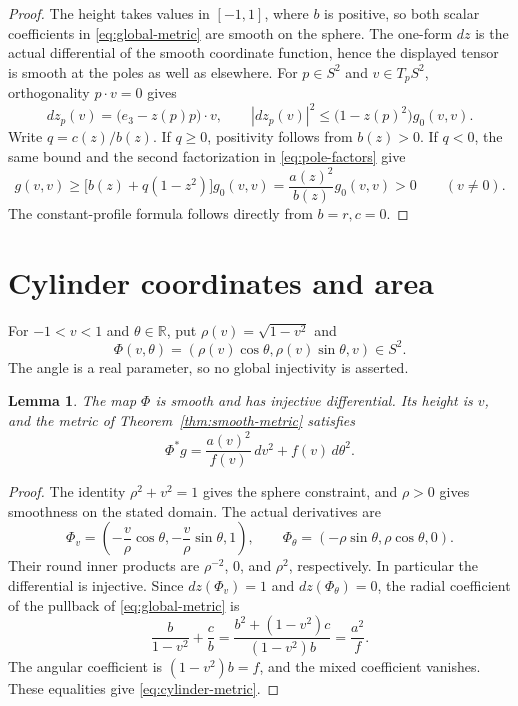 \documentclass[11pt]{article}
\newtheorem{lemma}[theorem]{Lemma}
\newcommand{\R}{\mathbb R}
\begin{document}
\begin{proof}
The height takes values in $[-1,1]$, where $b$ is positive, so both scalar
coefficients in \eqref{eq:global-metric} are smooth on the sphere. The
one-form $dz$ is the actual differential of the smooth coordinate function,
hence the displayed tensor is smooth at the poles as well as elsewhere.
For $p\in S^2$ and $v\in T_pS^2$, orthogonality $p\cdot v=0$ gives
\[
 dz_p(v)=\bigl(e_3-z(p)p\bigr)\cdot v,\qquad
 |dz_p(v)|^2\leq\bigl(1-z(p)^2\bigr)g_0(v,v).
\]
Write $q=c(z)/b(z)$. If $q\geq0$, positivity follows from $b(z)>0$.
If $q<0$, the same bound and the second factorization in
\eqref{eq:pole-factors} give
\[
 g(v,v)\geq\bigl[b(z)+q(1-z^2)\bigr]g_0(v,v)
       =\frac{a(z)^2}{b(z)}g_0(v,v)>0\qquad(v\ne0).
\]
The constant-profile formula follows directly from $b=r,c=0$.
\end{proof}

\section{Cylinder coordinates and area}

For $-1<v<1$ and $\theta\in\R$, put $\rho(v)=\sqrt{1-v^2}$ and
\[
 \Phi(v,\theta)=(\rho(v)\cos\theta,\rho(v)\sin\theta,v)\in S^2.
\]
The angle is a real parameter, so no global injectivity is asserted.

\begin{lemma}\label{lem:cylinder-metric}
The map $\Phi$ is smooth and has injective differential. Its height is $v$,
and the metric of Theorem~\ref{thm:smooth-metric} satisfies
\begin{equation}\label{eq:cylinder-metric}
 \Phi^*g=\frac{a(v)^2}{f(v)}\,dv^2+f(v)\,d\theta^2.
\end{equation}
\end{lemma}

\begin{proof}
The identity $\rho^2+v^2=1$ gives the sphere constraint, and $\rho>0$
gives smoothness on the stated domain. The actual derivatives are
\[
 \Phi_v=\left(-\frac v\rho\cos\theta,-\frac v\rho\sin\theta,1\right),
 \qquad
 \Phi_\theta=(-\rho\sin\theta,\rho\cos\theta,0).
\]
Their round inner products are $\rho^{-2}$, $0$, and $\rho^2$,
respectively. In particular the differential is injective. Since
$dz(\Phi_v)=1$ and $dz(\Phi_\theta)=0$, the radial coefficient of the
pullback of \eqref{eq:global-metric} is
\[
 \frac b{1-v^2}+\frac cb
 =\frac{b^2+(1-v^2)c}{(1-v^2)b}
 =\frac{a^2}{f}.
\]
The angular coefficient is $(1-v^2)b=f$, and the mixed coefficient
vanishes. These equalities give \eqref{eq:cylinder-metric}.
\end{proof}
\end{document}
